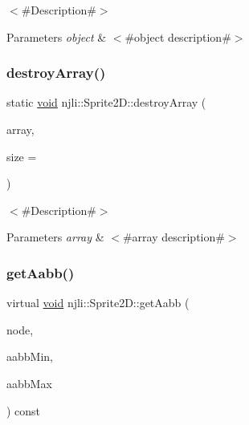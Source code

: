 $<$\#\+Description\#$>$


\begin{DoxyParams}{Parameters}
{\em object} & $<$\#object description\#$>$ \\
\hline
\end{DoxyParams}
\mbox{\label{classnjli_1_1_sprite2_d_a4b91a7652df3f55fe8ce1c309c273438}} 
\subsubsection{\texorpdfstring{destroy\+Array()}{destroyArray()}}
{\footnotesize\ttfamily static \mbox{\hyperlink{_thread_8h_af1e856da2e658414cb2456cb6f7ebc66}{void}} njli\+::\+Sprite2\+D\+::destroy\+Array (\begin{DoxyParamCaption}\item[{\mbox{\hyperlink{classnjli_1_1_sprite2_d}{Sprite2D}} $\ast$$\ast$}]{array,  }\item[{const \mbox{\hyperlink{_util_8h_a10e94b422ef0c20dcdec20d31a1f5049}{u32}}}]{size = {} }\end{DoxyParamCaption})\hspace{0.3cm}{\ttfamily [static]}}

$<$\#\+Description\#$>$


\begin{DoxyParams}{Parameters}
{\em array} & $<$\#array description\#$>$ \\
\hline
\end{DoxyParams}
\mbox{\label{classnjli_1_1_sprite2_d_add0a0f16202c5e62dfff65e08570316d}} 
\subsubsection{\texorpdfstring{get\+Aabb()}{getAabb()}}
{\footnotesize\ttfamily virtual \mbox{\hyperlink{_thread_8h_af1e856da2e658414cb2456cb6f7ebc66}{void}} njli\+::\+Sprite2\+D\+::get\+Aabb (\begin{DoxyParamCaption}\item[{\mbox{\hyperlink{classnjli_1_1_node}{Node}} $\ast$}]{node,  }\item[{bt\+Vector3 \&}]{aabb\+Min,  }\item[{bt\+Vector3 \&}]{aabb\+Max }\end{DoxyParamCaption}) const\hspace{0.3cm}{\ttfamily [virtual]}}



